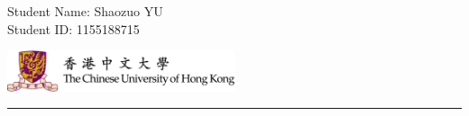 \documentclass[11pt,letterpaper]{article}
\begin{document}
\pagestyle{plain}

\begin{flushleft}
\quad Student Name: Shaozuo YU\\
\quad Student ID: 1155188715
\end{flushleft}

\begin{flushright}\vspace{-15mm}
\includegraphics[height=1.2cm]{cuhk_logo_2x.png}
\end{flushright}
 

 
\rule{\linewidth}{0.1mm}

\bigskip
\bigskip
\end{document}
